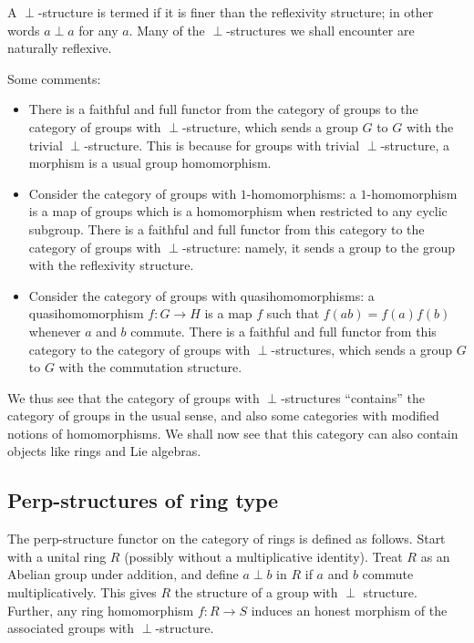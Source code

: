 \documentclass[a4paper]{amsart}
\begin{document}
A $\perp$-structure is termed
 if it is finer than the
reflexivity structure; in other words $a \perp a$ for any $a$. Many of
the $\perp$-structures we shall encounter are naturally reflexive.

Some comments:

\begin{itemize}

\item There is a faithful and full functor from the category of groups to the
  category of groups with $\perp$-structure, which sends a group $G$
  to $G$ with the trivial $\perp$-structure. This is because for
  groups with trivial $\perp$-structure, a morphism is a usual group
  homomorphism.

\item Consider the category of groups with $1$-homomorphisms: a
  $1$-homomorphism is a map of groups which is a homomorphism when
  restricted to any cyclic subgroup. There is a faithful and full functor from
  this category to the category of groups with $\perp$-structure:
  namely, it sends a group to the group with the reflexivity
  structure.

\item Consider the category of groups with quasihomomorphisms: a
  quasihomomorphism $f:G \to H$ is a map $f$ such that $f(ab) =
  f(a)f(b)$ whenever $a$ and $b$ commute. There is a faithful and full
  functor from this category to the category of groups with
  $\perp$-structures, which sends a group $G$ to $G$ with the
  commutation structure.

\end{itemize}

We thus see that the category of groups with $\perp$-structures
``contains'' the category of groups in the usual sense, and also some
categories with modified notions of homomorphisms. We shall now see
that this category can also contain objects like rings and Lie
algebras.

\subsection{Perp-structures of ring type}

\begin{definer}
  The perp-structure functor on the category of rings is defined as
  follows. Start with a unital ring $R$ (possibly without a
  multiplicative identity). Treat $R$ as an Abelian group under
  addition, and define $a \perp b$ in $R$ if $a$ and $b$ commute
  multiplicatively. This gives $R$ the structure of a group with
  $\perp$ structure. Further, any ring homomorphism $f:R \to S$
  induces an honest morphism of the associated groups with $\perp$-structure.
\end{definer}
\end{document}
